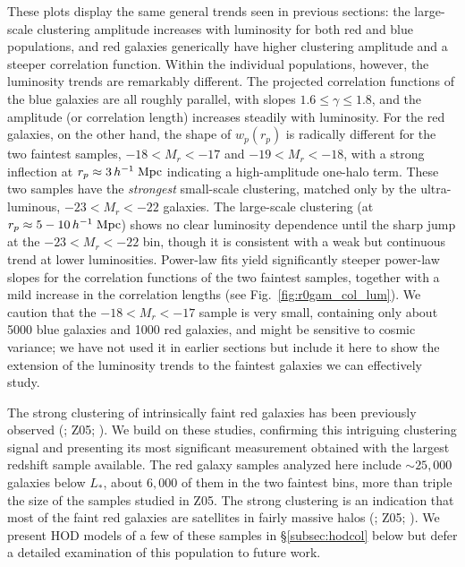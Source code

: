 \documentclass[]{emulateapj}
\newcommand{\hmpc}{\,h^{-1}\;{\rm Mpc}}
\newcommand{\wrp}{{w_p(r_p)}}
\begin{document}
These plots display the same general trends seen in previous sections:
the large-scale clustering amplitude increases with luminosity for
both red and blue
populations, and red galaxies generically have higher clustering
amplitude and a steeper correlation function.  
Within the individual
populations, however, the luminosity trends are remarkably different.
The projected correlation functions of the blue galaxies are all
roughly parallel, with slopes $1.6 \leq \gamma \leq 1.8$, and the
amplitude (or correlation length) increases steadily with luminosity.
For the red galaxies, on the other hand, the shape of $\wrp$ is
radically different for the two faintest samples,
$-18 < M_r < -17$ and $-19 < M_r < -18$, with a strong inflection
at $r_p \approx 3\hmpc$ indicating a high-amplitude one-halo term.
These two samples have the {\it strongest} small-scale clustering,
matched only by the ultra-luminous, $-23 < M_r < -22$ galaxies.
The large-scale clustering (at $r_p \approx 5-10\hmpc$) shows no
clear luminosity dependence until the sharp jump at the
$-23 < M_r < -22$ bin, though it is consistent with a weak but
continuous trend at lower luminosities.
Power-law fits yield significantly steeper power-law slopes
for the correlation functions of the two faintest samples,
together with a mild increase in the correlation lengths
(see Fig.~\ref{fig:r0gam_col_lum}). We caution that the
$-18 < M_r < -17$ sample is very small, containing only about
5000 blue galaxies and 1000 red galaxies, and might be sensitive
to cosmic variance; we have not used
it in earlier sections but include it here to show the extension 
of the luminosity trends to the faintest galaxies we can
effectively study.


The strong clustering of intrinsically faint red galaxies has 
been previously observed
(\citealt{norberg02,hogg03}; Z05; \citealt{swanson08,cresswell09}).
We build on these studies, confirming this intriguing clustering signal and 
presenting its most significant measurement obtained 
with the largest redshift sample available.  
The red galaxy samples analyzed here include $\sim 25,000$ galaxies
below $L_*$, about $6,000$ of them
in the two faintest bins, more than triple the size of the 
samples studied in Z05.
The strong clustering is an indication that most of the faint red
galaxies are satellites in fairly massive halos
(\citealt{berlind05}; Z05; \citealt{wang09}).
We present HOD models of a few of these samples in \S\ref{subsec:hodcol}
below but defer a detailed examination of this population to
future work.
\end{document}
